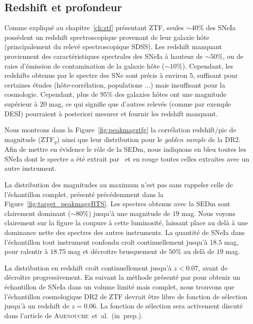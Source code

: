 \documentclass[../main/main.tex]{subfiles}
\begin{document}
\subsection{Redshift et profondeur}


Comme expliqué au chapitre~\ref{ch:ztf} présentant ZTF, seules
$\sim40\%$ des SNeIa possèdent un redshift spectroscopique provenant de
leur galaxie hôte (principalement du relevé spectroscopique SDSS). Les
redshift manquant proviennent des caractéristiques spectrales des SNeIa
à hauteur de $\sim50\%$, ou de raies d'émission de contamination de la
galaxie hôte ($\sim10\%$). Cependant, les redshifts obtenus par le
spectre des SNe sont précis à environ $5$\textperthousand, suffisant pour
certaines études (hôte-corrélation, populations ...) mais insuffisant
pour la cosmologie. Cependant, plus de $95\%$ des galaxies hôtes ont une
magnitude supérieur à $20$ mag, ce qui signifie que d'autres relevés (comme par
exemple DESI) pourraient à posteriori mesurer et fournir les redshift
manquant.

Nous montrons dans la Figure~\ref{fig:peakmagztfg} la corrélation
redshift/pic de magnitude (ZTF$_{g}$) ainsi que leur distribution pour
le \textit{golden sample} de la DR2.
Afin de mettre en évidence le rôle de la SEDm, nous indiquons en bleu toutes les SNeIa dont le spectre a été extrait par
\hypergal\ et en rouge toutes celles extraites avec un autre instrument.

La distribution des magnitudes au maximum n'est pas sans rappeler celle
de l'échantillon complet, présenté précédemment dans la Figure~\ref{fig:target_peakmaggBTS}.
Les spectres obtenus avec la SEDm sont clairement dominant ($\sim80\%$)
jusqu'à une magnitude de $19$ mag. Nous voyons clairement sur la figure
la coupure à cette luminosité, laissant place au delà à une dominance nette des
spectres des autres instruments. La quantité de SNeIa dans l'échantillon
tout instrument confondu croît 
continuellement jusqu'à $18.5$ mag, pour
ralentir à $18.75$ mag et décroitre brusquement de $50\%$ au delà de $19$
mag.

La distribution en redshift croît continuellement jusqu'à $z<0.07$,
avant de décroître progressivement. En suivant la méthode présenté par
\citet{NoraNicolas21} pour obtenir un échantillon de SNeIa dans un
volume limité mais complet, nous trouvons que l'échantillon cosmologique
DR2 de ZTF devrait être libre de fonction de sélection jusqu'à un
redshift de $z=0.06$. La fonction de sélection sera activement discuté dans
l'article de \mbox{\textsc{Amenouche} et al. (in prep.)}.
\end{document}
